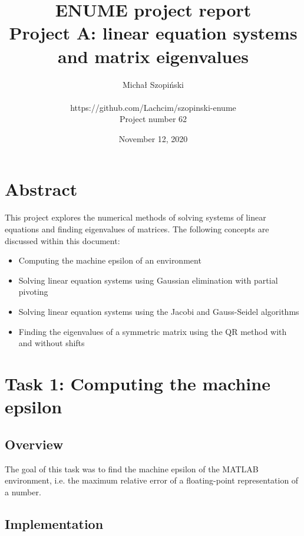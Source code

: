 \documentclass{article}
\begin{document}
	\title{ENUME project report\\Project A: linear equation systems\\and matrix
	eigenvalues}
	\author{Michał Szopiński\\\\
	https://github.com/Lachcim/szopinski-enume\\
	Project number 62}
	\date{November 12, 2020}
	\maketitle


	\setcounter{section}{-1}
	\section{Abstract}

	This project explores the numerical methods of solving systems of linear
	equations and finding eigenvalues of matrices. The following concepts are
	discussed within this document:

	\begin{itemize}
		\item Computing the machine epsilon of an environment
		\item Solving linear equation systems using Gaussian elimination with
		partial pivoting
		\item Solving linear equation systems using the Jacobi and Gauss-Seidel
		algorithms
		\item Finding the eigenvalues of a symmetric matrix using the QR method
		with and without shifts
	\end{itemize}

	\newpage

	\section{Task 1: Computing the machine epsilon}

	\subsection{Overview}

	The goal of this task was to find the machine epsilon of the MATLAB
	environment, i.e. the maximum relative error of a floating-point
	representation of a number.

	\subsection{Implementation}
\end{document}
